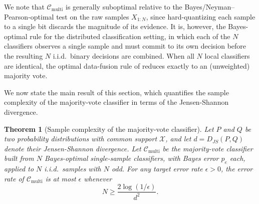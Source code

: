 \documentclass{article}
\newtheorem{theorem}{Theorem}
\begin{document}
We note that $\mathcal{C}_{\text{multi}}$ is generally suboptimal relative to the Bayes/Neyman--Pearson-optimal test on the raw samples $X_{1:N}$, since hard-quantizing each sample to a single bit discards the magnitude of its evidence. It is, however, the Bayes-optimal rule for the distributed classification setting, in which each of the $N$ classifiers observes a single sample and must commit to its own decision before the resulting $N$ i.i.d.\ binary decisions are combined. When all $N$ local classifiers are identical, the optimal data-fusion rule of \cite{chair_optimal_1986} reduces exactly to an (unweighted) majority vote.

We now state the main result of this section, which quantifies the sample complexity of the majority-vote classifier in terms of the Jensen-Shannon divergence.

\begin{theorem}[Sample complexity of the majority-vote classifier]
\label{thm:sample_complexity_multi}
Let $P$ and $Q$ be two probability distributions with common support $\mathcal{X}$, and let $d = D_{JS}(P,Q)$ denote their Jensen-Shannon divergence. Let $\mathcal{C}_{\text{multi}}$ be the majority-vote classifier built from $N$ Bayes-optimal single-sample classifiers, with Bayes error $p_e$ each, applied to $N$ i.i.d.\ samples with $N$ odd. For any target error rate $\epsilon > 0$, the error rate of $\mathcal{C}_{\text{multi}}$ is at most $\epsilon$ whenever
\begin{equation}
    N \geq \frac{2\log(1/\epsilon)}{d^2}.
\label{eq:thm_N_bound_multi}
\end{equation}
\end{theorem}
\end{document}
